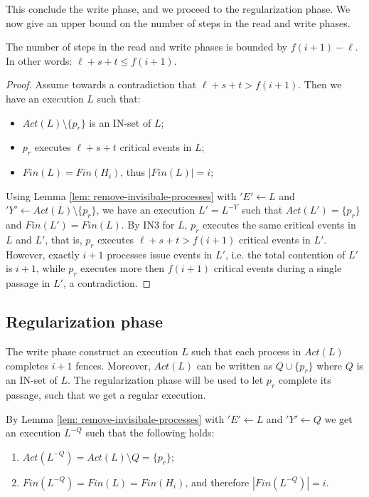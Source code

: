 This conclude the write phase, and we proceed to the regularization phase. We now give an upper bound on the number of steps in the read and write phases.

\begin{claim-section} \label{claim: write-upper-bound}
	The number of steps in the read and write phases is bounded by $f(i+1)-\ell$. In other words: $\ell+s+t \leq f(i+1)$.
\end{claim-section}

\begin{proof}
	Assume towards a contradiction that $\ell+s+t > f(i+1)$. Then we have an execution $L$ such that:
	\begin{itemize}
		\item $Act(L) \setminus \{p_r\}$ is an IN-set of $L$;
		\item $p_r$ executes $\ell+s+t$ critical events in $L$;
		\item $Fin(L) = Fin(H_i)$, thus $|Fin(L)| = i$;
	\end{itemize}

Using Lemma \ref{lem: remove-invisibale-processes} with $'E' \leftarrow L$ and $'Y' \leftarrow Act(L) \setminus \{p_r\}$, we have an execution $L' = L^{-Y}$ such that $Act(L') = \{p_r\}$ and $Fin(L') = Fin(L)$. By IN3 for $L$, $p_r$ executes the same critical events in $L$ and $L'$, that is, $p_r$ executes $\ell+s+t > f(i+1)$ critical events in $L'$. However, exactly $i+1$ processes issue events in $L'$, i.e. the total contention of $L'$ is $i+1$, while $p_r$ executes more then $f(i+1)$ critical events during a single passage in $L'$, a contradiction.
\end{proof}



\newpage
\subsection{Regularization phase}
The write phase construct an execution $L$ such that each process in $Act(L)$ completes $i+1$ fences. Moreover, $Act(L)$ can be written as $Q \cup \{p_r\}$ where $Q$ is an IN-set of $L$. The regularization phase will be used to let $p_r$ complete its passage, such that we get a regular execution.

By Lemma \ref{lem: remove-invisibale-processes} with $'E' \leftarrow L$ and $'Y' \leftarrow Q$ we get an execution $L^{-Q}$ such that the following holds:
\begin{enumerate}
	\item $Act(L^{-Q}) = Act(L) \setminus Q = \{p_r\}$;
	\item $Fin(L^{-Q}) = Fin(L) = Fin(H_i)$, and therefore $|Fin(L^{-Q})| = i$.
\end{enumerate}


